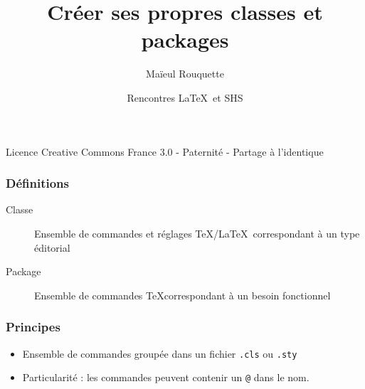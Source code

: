\documentclass{beamer}
\author{Maïeul Rouquette}
\date{Rencontres \LaTeX\ et SHS}
\title{Créer ses propres classes et packages}
\institute{Université de Lausanne --- IRSB}
\begin{document}
\begin{frame}
	\titlepage
	\vfill
	{\tiny Licence Creative Commons France 3.0 - Paternité - Partage à l'identique}
\end{frame}


\begin{frame}
	\frametitle{Définitions}
	\begin{description}
		\item[Classe]{Ensemble de commandes et réglages \TeX/\LaTeX\ correspondant à un type éditorial}
		\item[Package]{Ensemble de commandes \TeX correspondant à un besoin fonctionnel}
	\end{description}
\end{frame}

\begin{frame}
	\frametitle{Principes}
	\begin{itemize}
		\item<1>Ensemble de commandes groupée dans un fichier \verb+.cls+ ou \verb+.sty+
		\item<2>Particularité : les commandes peuvent contenir un \verb+@+ dans le nom.
	\end{itemize}
\end{frame}
\end{document}
